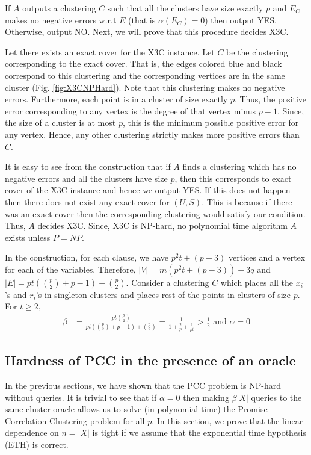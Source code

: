 \documentclass[12pt]{article}
\begin{document}
If $A$ outputs a clustering $C$ such that all the clusters have size exactly $p$ and $E_C$ makes no negative errors w.r.t $E$ (that is $\alpha(E_C) = 0$) then output YES. Otherwise, output NO. Next, we will prove that this procedure decides X3C. 

Let there exists an exact cover for the X3C instance. Let $C$ be the clustering corresponding to the exact cover. That is, the edges colored blue and black correspond to this clustering and the corresponding vertices are in the same cluster (Fig. \ref{fig:X3CNPHard}). Note that this clustering makes no negative errors. Furthermore, each point is in a cluster of size exactly $p$. Thus, the positive error corresponding to any vertex is the degree of that vertex minus $p-1$. Since, the size of a cluster is at most $p$, this is the minimum possible positive error for any vertex. Hence, any other clustering strictly makes more positive errors than $C$. 

It is easy to see from the construction that if $A$ finds a clustering which has no negative errors and all the clusters have size $p$, then this corresponds to exact cover of the X3C instance and hence we output YES. If this does not happen then there does not exist any exact cover for $(U, S)$. This is because if there was an exact cover then the corresponding clustering would satisfy our condition. Thus, $A$ decides X3C. Since, X3C is NP-hard, no polynomial time algorithm $A$ exists unless $P = NP$.

In the construction, for each clause, we have $p^2 t + (p - 3)$ vertices and a vertex for each of the variables. Therefore, $|V| = m (p^2 t + (p-3)) + 3q$ and $|E| = pt({p \choose 2}+p-1) + {p \choose 2}$.  Consider a clustering $C$ which places all the $x_i$'s  and $r_i$'s in singleton clusters and places rest of the points in clusters of size $p$. For $t \ge 2$,
\begin{align*}
  \beta &= \frac{pt{p \choose 2}}{pt({p \choose 2}+p-1) + {p \choose 2}} = \frac{1}{1 + \frac{2}{p} + \frac{1}{pt}} > \frac{1}{2} \text{ and }\alpha = 0
\end{align*} 

\subsection{Hardness of PCC in the presence of an oracle}
\label{section:PCCNPHardOracle}
In the previous sections, we have shown that the PCC problem is NP-hard without queries. It is trivial to see that if $\alpha = 0$ then making $\beta |X|$ queries to the same-cluster oracle allows us to solve (in polynomial time) the Promise Correlation Clustering problem for all $p$. In this section, we prove that the linear dependence on $n = |X|$ is tight if we assume that the exponential time hypothesis (ETH) is correct. 
\end{document}

